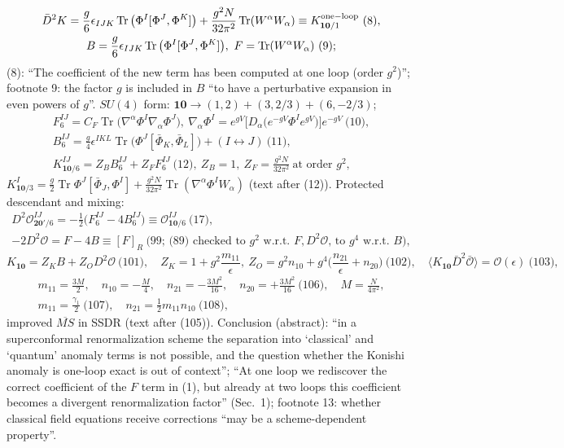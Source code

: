\documentclass[10pt]{article}
\begin{document}
\begin{gather*}
\bar D^2K=\frac g6\epsilon_{IJK}\operatorname{Tr}\big(\Phi^I[\Phi^J,\Phi^K]\big)+\frac{g^2N}{32\pi^2}\operatorname{Tr}(W^\alpha W_\alpha)\equiv K^{\rm one-loop}_{\mathbf{10}/1}\ \text{(8)},\\ B=\frac g6\epsilon_{IJK}\operatorname{Tr}\big(\Phi^I[\Phi^J,\Phi^K]\big),\ F=\operatorname{Tr}(W^\alpha W_\alpha)\ \text{(9)};
\end{gather*}
(8): ``The coefficient of the new term has been computed at one loop (order $g^2$)''; footnote 9: the factor $g$ is included in $B$ ``to have a perturbative expansion in even powers of $g$''. $SU(4)$ form: $\mathbf{10}\to(1,2)+(3,2/3)+(6,-2/3)$;
\begin{gather*}
F_6^{IJ}=C_F\operatorname{Tr}\big(\nabla^\alpha\Phi^I\nabla_\alpha\Phi^J\big),\ \nabla_\alpha\Phi^I=e^{gV}\big[D_\alpha\big(e^{-gV}\Phi^Ie^{gV}\big)\big]e^{-gV}\ \text{(10)},\\ B_6^{IJ}=\tfrac g4\epsilon^{IKL}\operatorname{Tr}\big(\Phi^J[\bar\Phi_K,\bar\Phi_L]\big)+(I\leftrightarrow J)\ \text{(11)},\\ K^{IJ}_{\mathbf{10}/6}=Z_BB_6^{IJ}+Z_FF_6^{IJ}\ \text{(12)},\ Z_B=1,\ Z_F=\frac{g^2N}{32\pi^2}\ \text{at order $g^2$},
\end{gather*}
$K^I_{\mathbf{10}/3}=\frac g2\operatorname{Tr}\Phi^J[\bar\Phi_J,\Phi^I]+\frac{g^2N}{32\pi^2}\operatorname{Tr}(\nabla^\alpha\Phi^IW_\alpha)$ (text after (12)). Protected descendant and mixing:
\begin{gather*}
D^2\mathcal O^{IJ}_{\mathbf{20}'/6}=-\tfrac12\big(F_6^{IJ}-4B_6^{IJ}\big)\equiv\mathcal O^{IJ}_{\mathbf{10}/6}\ \text{(17)},\\ -2D^2\mathcal O=F-4B\equiv[F]_R\ \text{(99; (89) checked to $g^2$ w.r.t.\ $F,D^2\mathcal O$, to $g^4$ w.r.t.\ $B$)},
\end{gather*}
\begin{equation*}
K_{\mathbf{10}}=Z_KB+Z_OD^2\mathcal O\ \text{(101)},\quad Z_K=1+g^2\frac{m_{11}}{\epsilon},\ Z_O=g^2n_{10}+g^4\Big(\frac{n_{21}}{\epsilon}+n_{20}\Big)\ \text{(102)},\quad \langle K_{\mathbf{10}}\bar D^2\bar{\mathcal O}\rangle=\mathcal O(\epsilon)\ \text{(103)},
\end{equation*}
\begin{gather*}
m_{11}=\frac{3M}{2},\quad n_{10}=-\frac M4,\quad n_{21}=-\frac{3M^2}{16},\quad n_{20}=+\frac{3M^2}{16}\ \text{(106)},\quad M=\frac{N}{4\pi^2},\\ m_{11}=\frac{\gamma_1}2\ \text{(107)},\quad n_{21}=\frac12m_{11}n_{10}\ \text{(108)},
\end{gather*}
improved $\overline{MS}$ in SSDR (text after (105)). Conclusion (abstract): ``in a superconformal renormalization scheme the separation into `classical' and `quantum' anomaly terms is not possible, and the question whether the Konishi anomaly is one-loop exact is out of context''; ``At one loop we rediscover the correct coefficient of the $F$ term in (1), but already at two loops this coefficient becomes a divergent renormalization factor'' (Sec.\ 1); footnote 13: whether classical field equations receive corrections ``may be a scheme-dependent property''.
\end{document}
